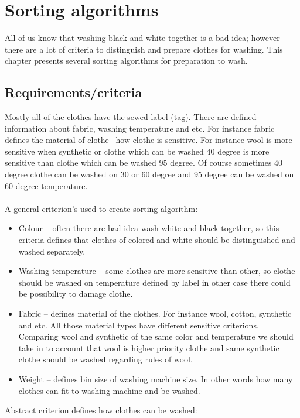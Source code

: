 %
\section{Sorting algorithms}

All of us know that washing black and white together is a bad idea; however there are a lot of criteria to distinguish and prepare clothes for washing. This chapter presents several sorting algorithms for preparation to wash. 

\subsection{Requirements/criteria}

Mostly all of the clothes have the sewed label (tag). There are defined information about fabric, washing temperature and etc. For instance fabric defines the material of clothe –how clothe is sensitive.  For instance wool is more sensitive when synthetic or clothe which can be washed 40 degree is more sensitive than clothe which can be washed 95 degree. Of course sometimes 40 degree clothe can be washed on 30 or 60 degree and 95 degree can be washed on 60 degree temperature. \\ \\ A general criterion’s used to create sorting algorithm:

\begin{itemize}
	\item Colour – often there are bad idea wash white and black together, so this criteria defines that clothes of colored and white should be distinguished and washed separately. 
	\item Washing temperature – some clothes are more sensitive than other, so clothe should be washed on temperature defined by label in other case there could be possibility to damage clothe.
	\item Fabric – defines material of the clothes. For instance wool, cotton, synthetic and etc. All those material types have different sensitive criterions. Comparing wool and synthetic of the same color and temperature we should take in to account that wool is higher priority clothe and same synthetic clothe should be washed regarding rules of wool.
	\item Weight – defines bin size of washing machine size. In other words how many clothes can fit to washing machine and be washed.
\end{itemize}

Abstract criterion defines how clothes can be washed:

